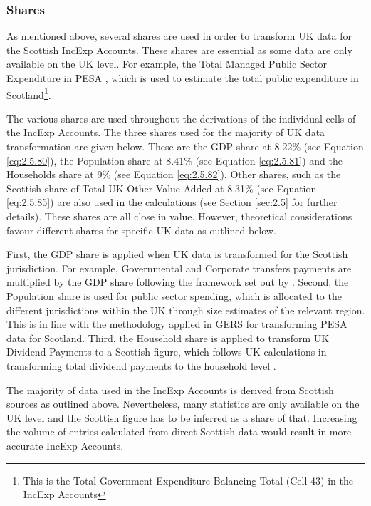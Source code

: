 \subsubsection{Shares}

As mentioned above, several shares are used in order to transform UK data for the Scottish IncExp Accounts. These shares are essential as some data are only available on the UK level. For example, the Total Managed Public Sector Expenditure in PESA \cite{HMTR2012}, which is used to estimate the total public expenditure in Scotland\footnote{This is the Total Government Expenditure Balancing Total (Cell 43) in the IncExp Accounts}.

\bigskip

The various shares are used throughout the derivations of the individual cells of the IncExp Accounts. The three shares used for the majority of UK data transformation are given below. These are the GDP share at 8.22\% (see Equation \ref{eq:2.5.80}), the Population share at 8.41\% (see Equation \ref{eq:2.5.81}) and the Households share at 9\% (see Equation \ref{eq:2.5.82}). Other shares, such as the Scottish share of Total UK Other Value Added at 8.31\% (see Equation \ref{eq:2.5.85}) are also used in the calculations (see Section \ref{sec:2.5} for further details). These shares are all close in value. However, theoretical considerations favour different shares for specific UK data as outlined below.

\bigskip

First, the GDP share is applied when UK data is transformed for the Scottish jurisdiction. For example, Governmental and Corporate transfers payments \cite{ONS2011c} are multiplied by the GDP share following the framework set out by . Second, the Population share is used for public sector spending, which is allocated to the different jurisdictions within the UK through size estimates of the relevant region. This is in line with the methodology applied in GERS \cite{ScotGov2013b} for transforming PESA \cite{HMTR2012} data for Scotland. Third, the Household share is applied to transform UK Dividend Payments to a Scottish figure, which follows UK calculations in transforming total dividend payments to the household level \cite{ONS2011c}.

\bigskip

The majority of data used in the IncExp Accounts is derived from Scottish sources as outlined above. Nevertheless, many statistics are only available on the UK level and the Scottish figure has to be inferred as a share of that. Increasing the volume of entries calculated from direct Scottish data would result in more accurate IncExp Accounts.

